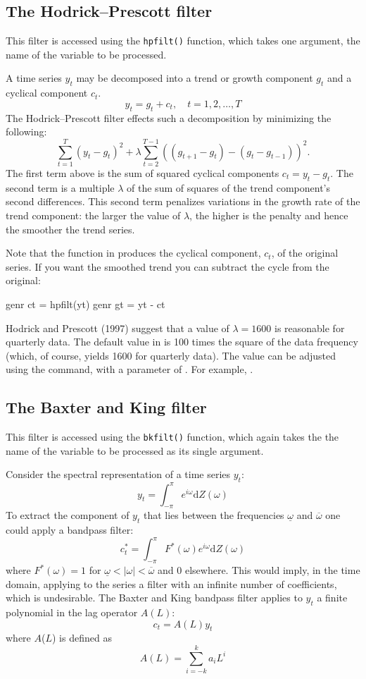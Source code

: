 \subsection{The Hodrick--Prescott filter}
\label{hodrick-prescott}

This filter is accessed using the \verb+hpfilt()+ function, which
takes one argument, the name of the variable to be processed.

A time series $y_t$ may be decomposed into a trend or growth
component $g_t$ and a cyclical component $c_t$.  
%
\[
y_t = g_t + c_t, \quad t = 1,2,\dots,T
\]
%
The Hodrick--Prescott filter effects such a decomposition by
minimizing the following:
%
\[
    \sum_{t = 1}^T {(y_t - g_t )^2 } + \lambda \sum_{t = 2}^{T -
      1} \left((g_{t+1} - g_t) - (g_t - g_{t - 1} )\right)^2 .
\]
%
The first term above is the sum of squared cyclical components $c_t =
y_t - g_t$. The second term is a multiple $\lambda$ of the sum of
squares of the trend component's second differences. This
second term penalizes variations in the growth rate of the trend
component: the larger the value of $\lambda$, the higher is the
penalty and hence the smoother the trend series.

Note that the  function in  produces the
cyclical component, $c_t$, of the original series.  If you want the
smoothed trend you can subtract the cycle from the original:

\begin{code}
genr ct = hpfilt(yt)
genr gt = yt - ct
\end{code}

Hodrick and Prescott (1997) suggest that a value of $\lambda = 1600$
is reasonable for quarterly data.  The default value in  is
100 times the square of the data frequency (which, of course, yields
1600 for quarterly data).  The value can be adjusted using the
 command, with a parameter of .  For example,
.


\subsection{The Baxter and King filter}
\label{baxter-king}

This filter is accessed using the \verb+bkfilt()+ function, which
again takes the the name of the variable to be processed as its single
argument.

Consider the spectral representation of a time series $y_t$:
%       
\[ y_t = \int_{-\pi}^{\pi} e^{i\omega} \mathrm{d} Z(\omega) \]
%
To extract the component of $y_t$ that lies between the frequencies
$\underline{\omega}$ and $\overline{\omega}$ one could apply a
bandpass filter:
%       
\[ c^*_t = \int_{-\pi}^{\pi} F^*(\omega) e^{i\omega} \mathrm{d}
Z(\omega) \]
%
where $F^*(\omega) = 1$ for $\underline{\omega} < |\omega| <
\overline{\omega}$ and 0 elsewhere. This would imply, in the time
domain, applying to the series a filter with an infinite number of
coefficients, which is undesirable. The Baxter and King bandpass
filter applies to $y_t$ a finite polynomial in the lag
operator $A(L)$:
%       
\[ c_t = A(L) y_t \]
%
where $A$($L$) is defined as
%       
\[ A(L) = \sum_{i=-k}^{k} a_i L^i \]

